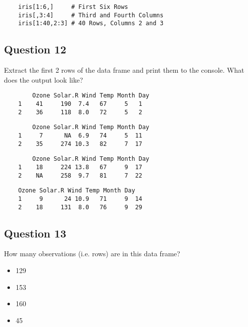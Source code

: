 \documentclass[12pt]{article}
\begin{document}
\begin{framed}
	\begin{verbatim}
	iris[1:6,]     # First Six Rows
	iris[,3:4]     # Third and Fourth Columns
	iris[1:40,2:3] # 40 Rows, Columns 2 and 3
	\end{verbatim}
\end{framed}


\newpage
\subsection*{Question 12}
\Large
Extract the first 2 rows of the data frame and print them to the console. What does the output look like?

\begin{framed}
	\begin{verbatim}
		Ozone Solar.R Wind Temp Month Day
	1    41     190  7.4   67     5   1
	2    36     118  8.0   72     5   2
	\end{verbatim}
\end{framed}
\begin{framed}
	\begin{verbatim} 
		Ozone Solar.R Wind Temp Month Day
	1     7      NA  6.9   74     5  11
	2    35     274 10.3   82     7  17
	\end{verbatim}
\end{framed}
\begin{framed}
	\begin{verbatim} 
		Ozone Solar.R Wind Temp Month Day
	1    18     224 13.8   67     9  17
	2    NA     258  9.7   81     7  22
\end{verbatim}
\end{framed}	\begin{framed}
	\begin{verbatim} 
	Ozone Solar.R Wind Temp Month Day
	1     9      24 10.9   71     9  14
	2    18     131  8.0   76     9  29
	\end{verbatim}
\end{framed}

\newpage

\subsection*{Question 13}
\Large
How many observations (i.e. rows) are in this data frame?
\begin{itemize}
	\item 129
	\item 153
	\item 160
	\item 45
\end{itemize}
\end{document}
